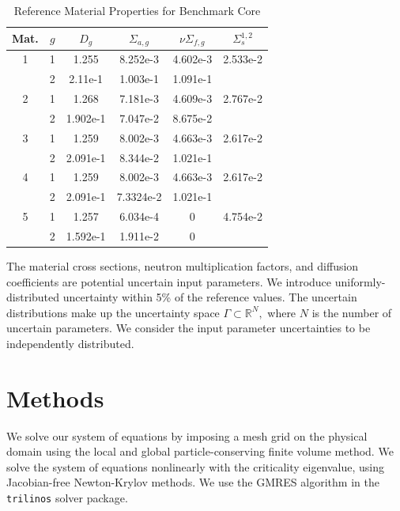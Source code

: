 \documentclass{anstrans} \usepackage{amsmath} \usepackage{amssymb}
\begin{document}
  \begin{table}[h] 
    \centering 
    \begin{tabular}{c c | c c cc} 
      Mat. & $g$ & $D_g$ & $\Sigma_{a,g}$ & $\nu\Sigma_{f,g}$ & $\Sigma_s^{1,2}$ \\ \hline 
      1 & 1 & 1.255 &8.252e-3 & 4.602e-3 & 2.533e-2 \\ 
        & 2 & 2.11e-1 & 1.003e-1 & 1.091e-1 & \\ \hline 
      2 & 1 & 1.268 & 7.181e-3 & 4.609e-3 & 2.767e-2 \\ 
        & 2 & 1.902e-1 & 7.047e-2 & 8.675e-2 & \\ \hline 
      3 & 1 & 1.259 & 8.002e-3 & 4.663e-3 & 2.617e-2 \\ 
        & 2 & 2.091e-1 & 8.344e-2 & 1.021e-1 & \\ \hline 
      4 & 1 & 1.259 & 8.002e-3 & 4.663e-3 & 2.617e-2 \\ 
        & 2 & 2.091e-1 & 7.3324e-2 & 1.021e-1 & \\ \hline 
      5 & 1 & 1.257 & 6.034e-4 & 0 & 4.754e-2 \\ 
        & 2 & 1.592e-1 & 1.911e-2 & 0 & 
      \end{tabular} 
      \caption{Reference Material Properties for Benchmark Core} 
      \label{tab:coremats} 
    \end{table}

The material cross sections, neutron multiplication factors, and diffusion coefficients are potential
uncertain input parameters.  We introduce uniformly-distributed uncertainty within 5\% of the reference
values.  The uncertain distributions make up the uncertainty space $\Gamma\subset\mathbb{R}^N,$ where $N$ is
the number of uncertain parameters.
We consider the input parameter uncertainties to be independently distributed.

\section{Methods}
We solve our system of equations by imposing a mesh grid on the physical domain using the local and global
particle-conserving finite volume method.  We solve the system of equations nonlinearly with the criticality
eigenvalue, using Jacobian-free Newton-Krylov methods.  We use the GMRES algorithm in the \texttt{trilinos}
solver package.%
\end{document}

